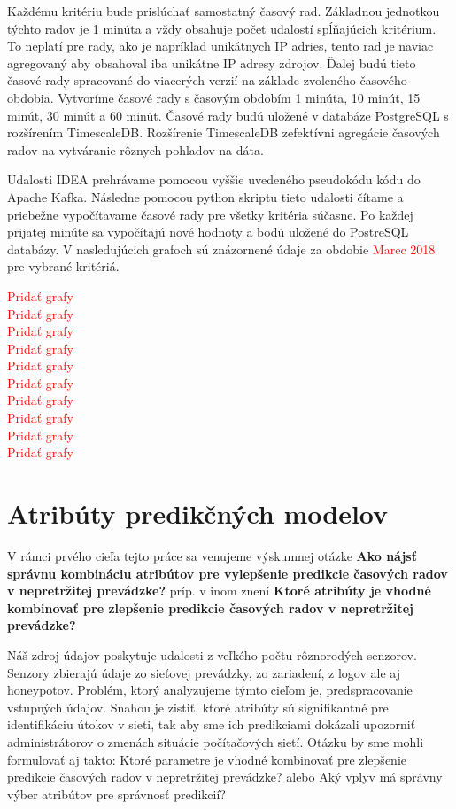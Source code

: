 \documentclass[thesismargins, thesislinespacing, openright, upjsfrontpage, combineabstracts]{rnthesis}
\begin{document}
Každému kritériu bude prislúchať samostatný časový rad. Základnou jednotkou týchto radov je 1 minúta a vždy obsahuje počet udalostí spĺňajúcich kritérium. To neplatí pre rady, ako je napríklad unikátnych IP adries, tento rad je naviac agregovaný aby obsahoval iba unikátne IP adresy zdrojov. Ďalej budú tieto časové rady spracované do viacerých verzií na základe zvoleného časového obdobia. Vytvoríme časové rady s časovým obdobím 1 minúta, 10 minút, 15 minút, 30 minút a 60 minút. Časové rady budú uložené v databáze PostgreSQL s rozšírením TimescaleDB. Rozšírenie TimescaleDB zefektívni agregácie časových radov na vytváranie rôznych pohľadov na dáta.

Udalosti IDEA prehrávame pomocou vyššie uvedeného pseudokódu kódu do Apache Kafka. Následne pomocou python skriptu tieto udalosti čítame a priebežne vypočítavame časové rady pre všetky kritéria súčasne. Po každej prijatej minúte sa vypočítajú nové hodnoty a bodú uložené do PostreSQL databázy. V nasledujúcich grafoch sú znázornené údaje za obdobie \textcolor{red}{Marec 2018} pre vybrané kritériá.

\textcolor{red}{Pridať grafy}\\
\textcolor{red}{Pridať grafy}\\
\textcolor{red}{Pridať grafy}\\
\textcolor{red}{Pridať grafy}\\
\textcolor{red}{Pridať grafy}\\
\textcolor{red}{Pridať grafy}\\
\textcolor{red}{Pridať grafy}\\
\textcolor{red}{Pridať grafy}\\
\textcolor{red}{Pridať grafy}\\
\textcolor{red}{Pridať grafy}

\section{Atribúty predikčných modelov}
V rámci prvého cieľa tejto práce sa venujeme výskumnej otázke \textbf{Ako nájsť správnu kombináciu atribútov pre vylepšenie predikcie časových radov v nepretržitej prevádzke?} príp. v inom znení \textbf{Ktoré atribúty je vhodné kombinovať pre zlepšenie predikcie časových radov v nepretržitej prevádzke?}

Náš zdroj údajov poskytuje udalosti z veľkého počtu rôznorodých senzorov. Senzory zbierajú údaje zo sieťovej prevádzky, zo zariadení, z logov ale aj honeypotov. Problém, ktorý analyzujeme týmto cieľom je, predspracovanie vstupných údajov. Snahou je zistiť, ktoré atribúty sú signifikantné pre identifikáciu útokov v sieti, tak aby sme ich predikciami dokázali upozorniť administrátorov o zmenách situácie počítačových sietí. Otázku by sme mohli formulovať aj takto: Ktoré parametre je vhodné kombinovať pre zlepšenie predikcie časových radov v nepretržitej prevádzke? alebo Aký vplyv má správny výber atribútov pre správnosť predikcií?
\end{document}

